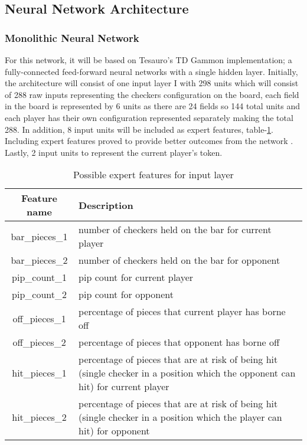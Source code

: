 \documentclass[12pt,a4paper]{article}
\begin{document}
\subsection{Neural Network Architecture}
\subsubsection{Monolithic Neural Network}
For this network, it will be based on Tesauro's \citeyear{DBLP:journals/neco/Tesauro94} TD Gammon implementation; a fully-connected feed-forward neural networks with a single hidden layer. Initially, the architecture will consist of one input layer I with 298 units which will consist of 288 raw inputs representing the checkers configuration on the board, each field in the board is represented by 6 units as there are 24 fields so 144 total units and each player has their own configuration represented separately making the total 288. In addition, 8 input units will be included as expert features, table-\ref{exfeat}. Including expert features proved to provide better outcomes from the network \cite{DBLP:journals/ai/Tesauro02}. Lastly, 2 input units to represent the current player's token. 
\begin{table}[htb]
    \centering
    \caption{Possible expert features for input layer}
    \vspace*{6pt}
    \label{exfeat}
    \begin{tabular}{cp{12cm}}
        \hline
        \hline
        Feature name & Description \\ 
        \hline
        bar\_pieces\_1 & number of checkers held on the bar for current player\\
        \hline
        bar\_pieces\_2 & number of checkers held on the bar for opponent\\
        \hline
        pip\_count\_1 & pip count for current player \\
        \hline
        pip\_count\_2 & pip count for opponent \\
        \hline
        off\_pieces\_1 & percentage of pieces that current player has borne off \\
        \hline
        off\_pieces\_2 & percentage of pieces that opponent has borne off \\
        \hline
        hit\_pieces\_1 & percentage of pieces that are at risk of being hit (single checker in a position which the opponent can hit) for current player \\
        \hline
        hit\_pieces\_2 & percentage of pieces that are at risk of being hit (single checker in a position which the player can hit) for opponent\\
        \hline
    \end{tabular}
\end{table}
\end{document}
